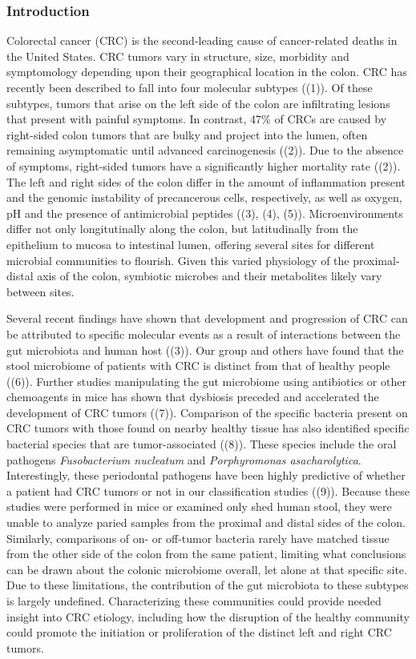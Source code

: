 \documentclass[11pt,]{article}
\begin{document}
\subsubsection{Introduction}\label{introduction}

Colorectal cancer (CRC) is the second-leading cause of cancer-related
deaths in the United States. CRC tumors vary in structure, size,
morbidity and symptomology depending upon their geographical location in
the colon. CRC has recently been described to fall into four molecular
subtypes ((1)). Of these subtypes, tumors that arise on the left side of
the colon are infiltrating lesions that present with painful symptoms.
In contrast, 47\% of CRCs are caused by right-sided colon tumors that
are bulky and project into the lumen, often remaining asymptomatic until
advanced carcinogenesis ((2)). Due to the absence of symptoms,
right-sided tumors have a significantly higher mortality rate ((2)). The
left and right sides of the colon differ in the amount of inflammation
present and the genomic instability of precancerous cells, respectively,
as well as oxygen, pH and the presence of antimicrobial peptides ((3),
(4), (5)). Microenvironments differ not only longitutinally along the
colon, but latitudinally from the epithelium to mucosa to intestinal
lumen, offering several sites for different microbial communities to
flourish. Given this varied physiology of the proximal-distal axis of
the colon, symbiotic microbes and their metabolites likely vary between
sites.

Several recent findings have shown that development and progression of
CRC can be attributed to specific molecular events as a result of
interactions between the gut microbiota and human host ((3)). Our group
and others have found that the stool microbiome of patients with CRC is
distinct from that of healthy people ((6)). Further studies manipulating
the gut microbiome using antibiotics or other chemoagents in mice has
shown that dysbiosis preceded and accelerated the development of CRC
tumors ((7)). Comparison of the specific bacteria present on CRC tumors
with those found on nearby healthy tissue has also identified specific
bacterial species that are tumor-associated ((8)). These species include
the oral pathogens \emph{Fusobacterium nucleatum} and
\emph{Porphyromonas asacharolytica}. Interestingly, these periodontal
pathogens have been highly predictive of whether a patient had CRC
tumors or not in our classification studies ((9)). Because these studies
were performed in mice or examined only shed human stool, they were
unable to analyze paried samples from the proximal and distal sides of
the colon. Similarly, comparisons of on- or off-tumor bacteria rarely
have matched tissue from the other side of the colon from the same
patient, limiting what conclusions can be drawn about the colonic
microbiome overall, let alone at that specific site. Due to these
limitations, the contribution of the gut microbiota to these subtypes is
largely undefined. Characterizing these communities could provide needed
insight into CRC etiology, including how the disruption of the healthy
community could promote the initiation or proliferation of the distinct
left and right CRC tumors.
\end{document}
